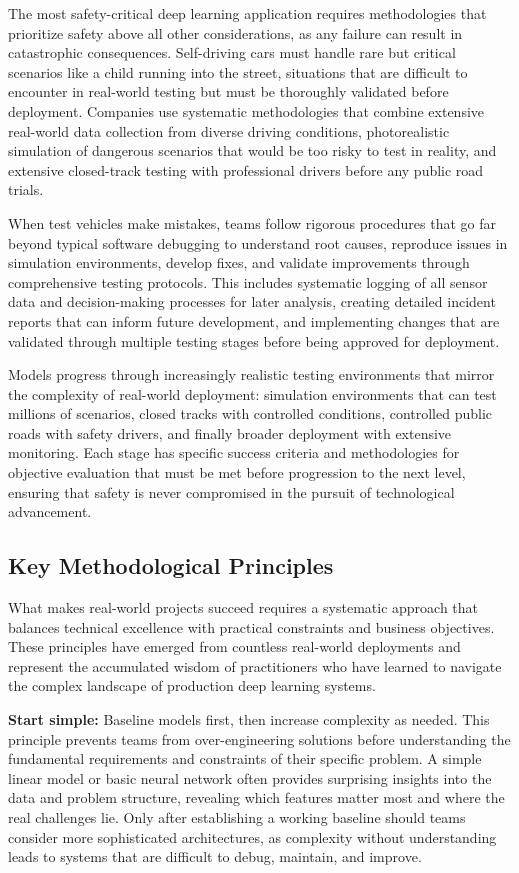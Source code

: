 The most safety-critical deep learning application requires methodologies that prioritize safety above all other considerations, as any failure can result in catastrophic consequences. Self-driving cars must handle rare but critical scenarios like a child running into the street, situations that are difficult to encounter in real-world testing but must be thoroughly validated before deployment. Companies use systematic methodologies that combine extensive real-world data collection from diverse driving conditions, photorealistic simulation of dangerous scenarios that would be too risky to test in reality, and extensive closed-track testing with professional drivers before any public road trials.

When test vehicles make mistakes, teams follow rigorous procedures that go far beyond typical software debugging to understand root causes, reproduce issues in simulation environments, develop fixes, and validate improvements through comprehensive testing protocols. This includes systematic logging of all sensor data and decision-making processes for later analysis, creating detailed incident reports that can inform future development, and implementing changes that are validated through multiple testing stages before being approved for deployment.

Models progress through increasingly realistic testing environments that mirror the complexity of real-world deployment: simulation environments that can test millions of scenarios, closed tracks with controlled conditions, controlled public roads with safety drivers, and finally broader deployment with extensive monitoring. Each stage has specific success criteria and methodologies for objective evaluation that must be met before progression to the next level, ensuring that safety is never compromised in the pursuit of technological advancement.

\subsection{Key Methodological Principles}

What makes real-world projects succeed requires a systematic approach that balances technical excellence with practical constraints and business objectives. These principles have emerged from countless real-world deployments and represent the accumulated wisdom of practitioners who have learned to navigate the complex landscape of production deep learning systems.

\textbf{Start simple:} Baseline models first, then increase complexity as needed. This principle prevents teams from over-engineering solutions before understanding the fundamental requirements and constraints of their specific problem. A simple linear model or basic neural network often provides surprising insights into the data and problem structure, revealing which features matter most and where the real challenges lie. Only after establishing a working baseline should teams consider more sophisticated architectures, as complexity without understanding leads to systems that are difficult to debug, maintain, and improve.

